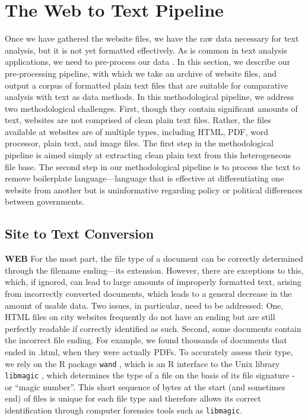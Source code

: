 \documentclass[11pt]{article}
\begin{document}
\section{The Web to Text Pipeline}

Once we have gathered the website files, we have the raw data necessary for text analysis, but it is not yet formatted effectively. As is common in text analysis applications, we need to pre-process our data \citep{denny2018text}. In this section, we describe our pre-processing pipeline, with which we take an archive of website files, and output a corpus of formatted plain text files that are suitable for comparative analysis with text as data methods. In this methodological pipeline, we address two methodological challenges. First, though they contain significant amounts of text, websites are not comprised of clean plain text files. Rather, the files available at websites are of multiple types, including HTML, PDF, word processor, plain text, and image files. The first step in the methodological pipeline is aimed simply at extracting clean plain text from this heterogeneous file base. The second step in our methodological pipeline is to process the text to remove boilerplate language---language that is effective at differentiating one website from another but is uninformative regarding policy or political differences between governments. 



\subsection{Site to Text Conversion}
{\bf WEB}
For the most part, the file type of a document can be correctly determined through the filename ending---its extension. However, there are exceptions to this, which, if ignored, can lead to large amounts of improperly formatted text, arising from incorrectly converted documents, which leads to a general decrease in the amount of usable data. Two issues, in particular, need to be addressed: One, HTML files on city websites frequently do not have an ending but are still perfectly readable if correctly identified as such. Second, some documents contain the incorrect file ending. For example, we found thousands of documents that ended in .html, when they were actually PDFs. To accurately assess their type, we rely on the R package \texttt{wand} \citep{wand}, which is an R interface to the Unix library \texttt{libmagic} \citep{darwin2008libmagic}, which determines the type of a file on the basis of its file signature - or ``magic number''. This short sequence of bytes at the start (and sometimes end) of files is unique for each file type and therefore allows its correct identification through computer forensics tools such as \texttt{libmagic}.
\end{document}
